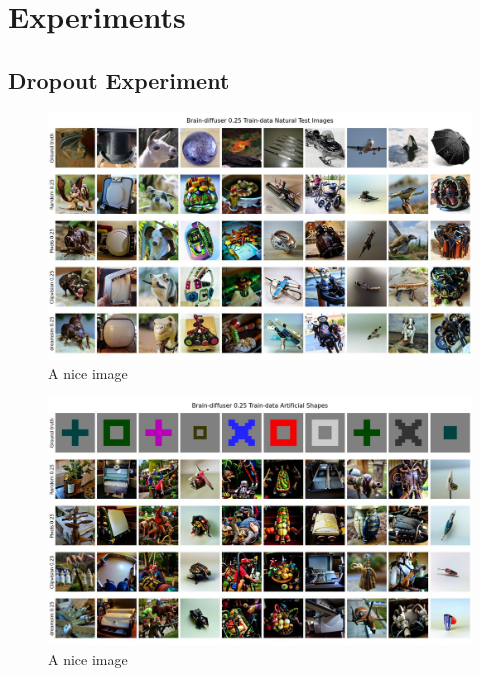 \chapter{Experiments}
\section{Dropout Experiment}


\begin{figure}[ht]
   \centering
   \includegraphics[width=1\textwidth]{plots/dropout_qual_eval_bd_test.JPEG}
   \caption{A nice image}\label{fig:dropout_qual_eval_bd_test}
\end{figure}

\begin{figure}[ht]
   \centering
   \includegraphics[width=1\textwidth]{plots/dropout_qual_eval_bd_art.JPEG}
   \caption{A nice image}\label{fig:dropout_qual_eval_bd_art}
\end{figure}

